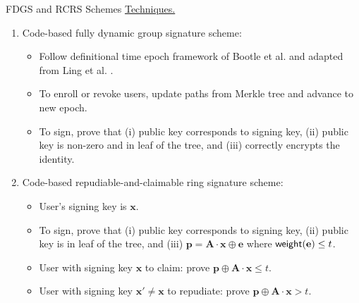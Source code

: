 \begin{frame}{FDGS and RCRS Schemes}
	\underline{Techniques.}\pause
	\begin{enumerate}
		\item Code-based fully dynamic group signature scheme:\pause
		\begin{itemize}
			\item Follow definitional time epoch framework of Bootle et al. \cite{BootleCCGG16} and adapted from Ling et al. \cite{LingNWX17}.\pause
			\item To enroll or revoke users, update paths from Merkle tree and advance to new epoch.\pause
			\item To sign, prove that (i) public key corresponds to signing key, (ii) public key is non-zero and in leaf of the tree, and (iii) correctly encrypts the identity.\pause
		\end{itemize}
		\item Code-based repudiable-and-claimable ring signature scheme:\pause
		\begin{itemize}
			\item User's signing key is $\mathbf{x}$.\pause
			\item To sign, prove that (i) public key corresponds to signing key, (ii) public key is in leaf of the tree, and (iii) $\mathbf{p} = \mathbf{A}\cdot \mathbf{x} \oplus \mathbf{e}$ where $\mathsf{weight}(\mathbf{e}) \leq t$.\pause
			\item User with signing key $\mathbf{x}$ to claim: prove $\mathbf{p} \oplus \mathbf{A}\cdot\mathbf{x} \leq t$. \pause
			\item User with signing key $\mathbf{x}'\not= \mathbf{x}$ to repudiate: prove $\mathbf{p} \oplus\mathbf{A}\cdot\mathbf{x} > t$.
		\end{itemize}
	\end{enumerate}
\end{frame}